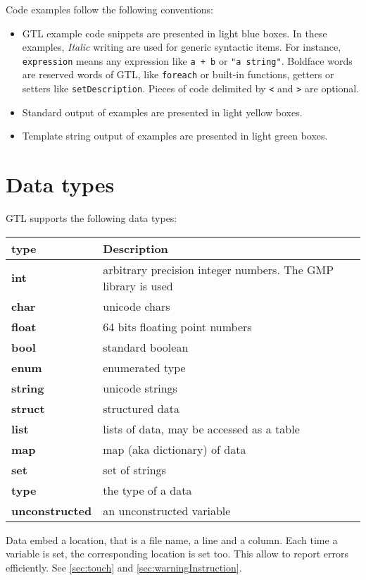 \documentclass[10pt,openright,twosides,final]{memoir}
\newcommand{\gtlinline}[1]{\colorbox{light-blue}{\lstinline[language=gtl]{#1}}}
\begin{document}
Code examples follow the following conventions:
\begin{itemize}[noitemsep]
\item GTL example code snippets are presented in \colorbox{light-blue}{light blue boxes}. In these examples, {\em Italic} writing are used for generic syntactic items. For instance, \gtlinline{expression} means any expression like \gtlinline{a + b} or \gtlinline{"a string"}. Boldface words are reserved words of GTL, like \gtlinline{foreach} or built-in functions, getters or setters like \gtlinline{setDescription}. Pieces of code delimited by \gtlinline{<} and \gtlinline{>} are optional.
\item Standard output of examples are presented in \colorbox{light-yellow}{light yellow boxes}.
\item Template string output of examples are presented in \colorbox{light-green}{light green boxes}.
\end{itemize}

\chapter{Data types}

GTL supports the following data types:
\begin{longtable}{>{\bfseries\ttfamily\small}l|l}
{\bfseries type}&{\bfseries Description}\\
\hline\endhead
 {int}&
  {arbitrary precision integer numbers. The GMP library is used}\\
 {char}&
  {unicode chars}\\
 {float}&
  {64 bits floating point numbers}\\
 {bool}&
  {standard boolean}\\
 {enum}&
  {enumerated type}\\
 {string}&
  {unicode strings}\\
 {struct}&
  {structured data}\\
 {list}&
  {lists of data, may be accessed as a table}\\
 {map}&
  {map (aka dictionary) of data}\\
 {set}&
  {set of strings}\\
 {type}&
  {the type of a data}\\
 {unconstructed}&
  {an unconstructed variable}
\end{longtable}

Data embed a location, that is a file name, a line and a column. Each time a variable is set, the corresponding location is set too. This allow to report errors efficiently. See \ref{sec:touch} and \ref{sec:warningInstruction}.
\end{document}
